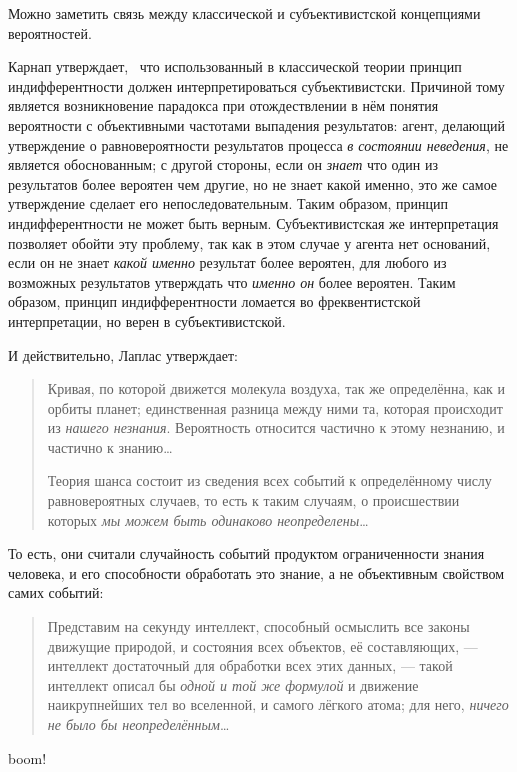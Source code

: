 \documentclass[14pt]{extarticle}
\begin{document}
\begin{Remark}
Можно заметить связь между классической и субъективистской концепциями вероятностей.

Карнап утверждает,~\cite[стр. 5]{Carnap} что использованный в классической теории принцип индифферентности должен интерпретироваться субъективистски. Причиной тому является возникновение парадокса при отождествлении в нём понятия вероятности с объективными частотами выпадения результатов: агент, делающий утверждение о равновероятности результатов процесса \emph{в состоянии неведения}, не является обоснованным; с другой стороны, если он \emph{знает} что один из результатов более вероятен чем другие, но не знает какой именно, это же самое утверждение сделает его непоследовательным. Таким образом, принцип индифферентности не может быть верным. Субъективистская же интерпретация позволяет обойти эту проблему, так как в этом случае у агента нет оснований, если он не знает \emph{какой именно} результат более вероятен, для любого из возможных результатов утверждать что \emph{именно он} более вероятен. Таким образом, принцип индифферентности ломается во фреквентистской интерпретации, но верен в субъективистской.

И действительно, Лаплас утверждает:~\cite[стр. 6]{Laplace}
\begin{quote}
Кривая, по которой движется молекула воздуха, так же определённа, как и орбиты планет; единственная разница между ними та, которая происходит из \emph{нашего незнания}. Вероятность относится частично к этому незнанию, и частично к знанию\dots

Теория шанса состоит из сведения всех событий к определённому числу равновероятных случаев, то есть к таким случаям, о происшествии которых \emph{мы можем быть одинаково неопределены}\dots
\end{quote}

То есть, они считали случайность событий продуктом ограниченности знания человека, и его способности обработать это знание, а не объективным свойством самих событий:~\cite[стр. 4]{Laplace}
\begin{quote}
Представим на секунду интеллект, способный осмыслить все законы движущие природой, и состояния всех объектов, её составляющих, --- интеллект достаточный для обработки всех этих данных, --- такой интеллект описал бы \emph{одной и той же формулой} и движение наикрупнейших тел во вселенной, и самого лёгкого атома; для него, \emph{ничего не было бы неопределённым}\dots
\end{quote}
{\color{white}boom!}
\end{Remark}
\end{document}
